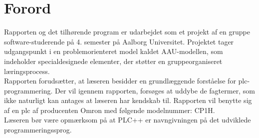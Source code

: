 \section*{Forord}
\label{sec:forord}
Rapporten og det tilhørende program er udarbejdet som et projekt af en gruppe software-studerende på 4. semester på Aalborg Universitet. Projektet tager udgangspunkt i en problemorienteret model kaldet AAU-modellen, som indeholder specialdesignede elementer, der støtter en gruppeorganiseret læringsprocess. \\

\noindent Rapporten forudsætter, at læseren besidder en grundlæggende forståelse for \gls{plc}-programmering. Der vil igennem rapporten, forsøges at uddybe de fagtermer, som ikke naturligt kan antages at læseren har kendskab til. Rapporten vil benytte sig af en \gls{plc} af producenten Omron med følgende modelnummer: CP1H. \\

\noindent Læseren bør være opmærksom på at PLC++ er navngivningen på det udviklede programmeringssprog.